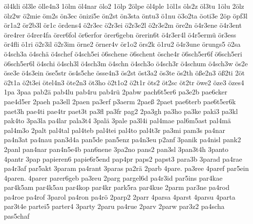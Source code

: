 {    öl4kli
    öl3le
    ölle4n3
    1ölm
    öl4nar
    ölo2
    1ölp
    2ölpe
    öl4ple
    1öl1s
    öls2z
    öl3tu
    1ölu
    2ölz
    ölz2w
    ö2mie
    öm2s
    ön3ec
    önizi5e
    ön2st
    ön3sta
    öntu3
    ö1nu
    ö3o2ta
    öoti3e
    2öp
    öpf3l
    ör1a2
    ör2b3l
    ör1c
    ördens4
    ö2r3ec
    ö2r3ei
    ö2r3e2l
    ö2r3e2m
    öre2n
    ö4r3ene
    ö4r3ent
    öre4rer
    ö4rer4fa
    örer6fol
    ör6erfor
    örer6gebn
    örerin6t
    ö4r3er4l
    ö4r5ermü
    ör3ess
    ör4fli
    ö1ri
    ö2r3il
    ö2r3im
    örne2
    örner4v
    ör1o2
    örs2k
    ö1ru2
    ö4r3une
    örungs5
    ö2sa
    ö4sch3a
    ö4schä
    ö4schef
    ö4sch5ei
    ö6schene
    ö6schent
    ösche4r
    ö6sch5er6f
    ö6sch5eri
    ö6sch5er6l
    ö4schi
    ö4sch3l
    ö4sch3m
    ö4schn
    ö4sch3o
    ö4sch3r
    ö4schum
    ö4sch3w
    ös2e
    öse3e
    ö4s3ein
    öse5str
    ös4s5che
    össe4n3
    ös2st
    öst3a2
    ös3te
    ös2th
    öße2n3
    öß2ti
    2öt
    ö2t1a
    ö2t3ei
    ötel4n3
    öte2n3
    öt3ho
    ö2t1o2
    ö2t1r
    öts2
    öt2sc
    öt2tr
    öwe2
    öze3
    özes4
    1pa
    3paa
    pab2ä
    pab4lu
    pab4ru
    pab4rü
    2pabw
    pach6t5er6
    pa3e2b
    pae6cker
    pae4d5er
    2paeh
    pa3ell
    2paen
    pa3erf
    p3aerm
    2paeß
    2paet
    pae6terb
    pae6t5er6k
    paet3h
    pae4ti
    pae4tr
    paet3t
    pa3fl
    pa3fr
    pag2
    2pa3gh
    pa3ho
    pa3ke
    paki3
    pa3kl
    pak4to
    3pa3la
    pa4lar
    pala3t4
    3palä
    3pale
    pa3l4i
    pal4mae
    pal6m5ast
    pal4mä
    pal4m3o
    2palt
    pal4tal
    pal4teb
    pal4tei
    pal4to
    pal4t3r
    pa3mi
    pam3s
    pa4nar
    pa4n3at
    pa4nau
    pan3d4a
    pan5de
    pan5enz
    pa4n3eu
    p2anf
    3panik
    pa4nisl
    pank2
    2panl
    pan4nar
    pan4n5e4b
    pan6nene
    3pa2no
    pans2
    pan3sl
    3pan3t4h
    3panto
    4pantr
    3pap
    papieren6
    papie6r5end
    pap4pr
    paps2
    papst3
    para3b
    3parad
    pa4rae
    pa4r3af
    par5akt
    3param
    pa4rant
    3paras
    pa2rä
    2parb
    4pare.
    pa3ree
    4paref
    par5ein
    4paren.
    4parer
    parer6geb
    pa3reu
    2parg
    pargel6d
    pa4r3id
    par5ins
    par4kae
    par4k5am
    par4k5au
    par4kop
    par4kr
    park5ra
    par4kue
    2parm
    par3ne
    pa4rod
    pa4roe
    pa4rof
    3parol
    pa4ron
    pa4rö
    2parp2
    2parr
    4parsa
    4parst
    4parsu
    4parta
    par3t4e
    partei5
    parter4
    3party
    2paru
    pa4rue
    2parv
    2parw
    par3z2
    pa4scha
    pas5chaf
}
